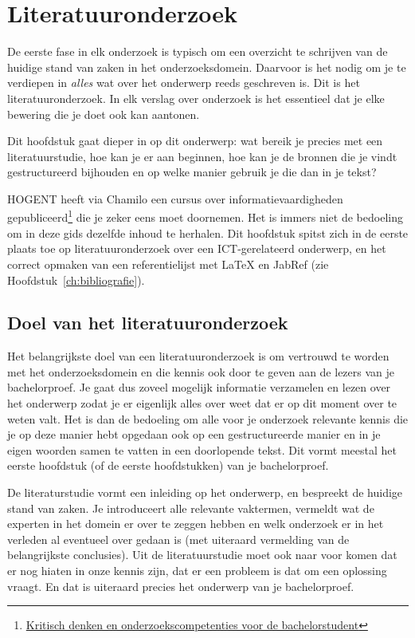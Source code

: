 \chapter{Literatuuronderzoek}%
\label{ch:literatuuronderzoek}

De eerste fase in elk onderzoek is typisch om een overzicht te schrijven van de huidige stand van zaken in het onderzoeksdomein. Daarvoor is het nodig om je te verdiepen in \emph{alles} wat over het onderwerp reeds geschreven is. Dit is het literatuuronderzoek. In elk verslag over onderzoek is het essentieel dat je elke bewering die je doet ook kan aantonen.

Dit hoofdstuk gaat dieper in op dit onderwerp: wat bereik je precies met een literatuurstudie, hoe kan je er aan beginnen, hoe kan je de bronnen die je vindt gestructureerd bijhouden en op welke manier gebruik je die dan in je tekst?

HOGENT heeft via Chamilo een cursus over informatievaardigheden gepubliceerd\footnote{\href{https://chamilo.hogent.be/index.php?go=CourseViewer&application=Chamilo\%5CApplication\%5CWeblcms&course=22068}{Kritisch denken en onderzoekscompetenties voor de bachelorstudent}} die je zeker eens moet doornemen. Het is immers niet de bedoeling om in deze gids dezelfde inhoud te herhalen. Dit hoofdstuk spitst zich in de eerste plaats toe op literatuuronderzoek over een ICT-gerelateerd onderwerp, en het correct opmaken van een referentielijst met {\LaTeX} en JabRef (zie Hoofdstuk~\ref{ch:bibliografie}).

\section{Doel van het literatuuronderzoek}%
\label{sec:doel-literatuuronderzoek}

Het belangrijkste doel van een literatuuronderzoek is om vertrouwd te worden met het onderzoeksdomein en die kennis ook door te geven aan de lezers van je bachelorproef. Je gaat dus zoveel mogelijk informatie verzamelen en lezen over het onderwerp zodat je er eigenlijk alles over weet dat er op dit moment over te weten valt. Het is dan de bedoeling om alle voor je onderzoek relevante kennis die je op deze manier hebt opgedaan ook op een gestructureerde manier en in je eigen woorden samen te vatten in een doorlopende tekst. Dit vormt meestal het eerste hoofdstuk (of de eerste hoofdstukken) van je bachelorproef.

De literaturstudie vormt een inleiding op het onderwerp, en bespreekt de huidige stand van zaken. Je introduceert alle relevante vaktermen, vermeldt wat de experten in het domein er over te zeggen hebben en welk onderzoek er in het verleden al eventueel over gedaan is (met uiteraard vermelding van de belangrijkste conclusies). Uit de literatuurstudie moet ook naar voor komen dat er nog hiaten in onze kennis zijn, dat er een probleem is dat om een oplossing vraagt. En dat is uiteraard precies het onderwerp van je bachelorproef.

